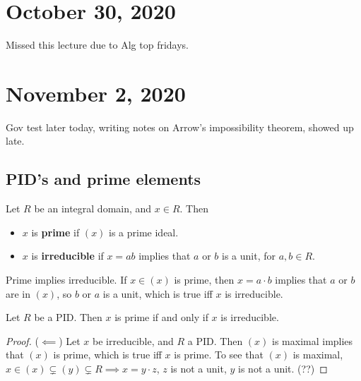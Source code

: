 \section{October 30, 2020}
Missed this lecture due to Alg top fridays.
\section{November 2, 2020}
Gov test later today, writing notes on Arrow's impossibility theorem, showed up late.
\subsection{PID's and prime elements}
\begin{definition}
    Let $R$ be an integral domain, and $x\in R$. Then 
    \begin{itemize}
        \item $x$ is \textbf{prime} if $(x)$ is a prime ideal.
        \item $x$ is \textbf{irreducible} if $x=ab$ implies that $a$ or $b$ is a unit, for $a,b\in R$.
    \end{itemize}
\end{definition}
\begin{remark}
    Prime implies irreducible. If $x\in (x)$ is prime, then $x=a\cdot b$ implies that $a$ or $b$ are in $(x)$, so $b$ or $a$ is a unit, which is true iff $x$ is irreducible.
\end{remark}
\begin{cor}
    Let $R$ be a PID. Then $x$ is prime if and only if $x$ is irreducible.
\end{cor}
\begin{proof}
    ($\impliedby $) Let $x$ be irreducible, and $R$ a PID. Then $(x)$ is maximal implies that $(x)$ is prime, which is true iff $x$ is prime. To see that $(x)$ is maximal, $x\in (x)\subsetneq (y) \subsetneq R \implies x=y\cdot z$, $z$ is not a unit, $y$ is not a unit. (??)
\end{proof}

